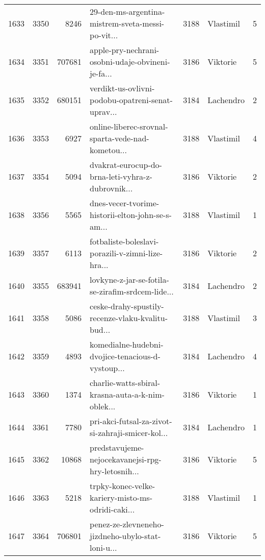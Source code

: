 \begin{tabular}{lrrlrlr}
1633 &       3350 &     8246 &  29-den-ms-argentina-mistrem-sveta-messi-po-vit... &     3188 &                    Vlastimil &               5 \\
1634 &       3351 &   707681 &  apple-pry-nechrani-osobni-udaje-obvineni-je-fa... &     3186 &                     Viktorie &               5 \\
1635 &       3352 &   680151 &  verdikt-us-ovlivni-podobu-opatreni-senat-uprav... &     3184 &                    Lachendro &               2 \\
1636 &       3353 &     6927 &  online-liberec-srovnal-sparta-vede-nad-kometou... &     3188 &                    Vlastimil &               4 \\
1637 &       3354 &     5094 &  dvakrat-eurocup-do-brna-leti-vyhra-z-dubrovnik... &     3186 &                     Viktorie &               2 \\
1638 &       3356 &     5565 &  dnes-vecer-tvorime-historii-elton-john-se-s-am... &     3188 &                    Vlastimil &               1 \\
1639 &       3357 &     6113 &  fotbaliste-boleslavi-porazili-v-zimni-lize-hra... &     3186 &                     Viktorie &               2 \\
1640 &       3355 &   683941 &  lovkyne-z-jar-se-fotila-se-zirafim-srdcem-lide... &     3184 &                    Lachendro &               2 \\
1641 &       3358 &     5086 &  ceske-drahy-spustily-recenze-vlaku-kvalitu-bud... &     3188 &                    Vlastimil &               3 \\
1642 &       3359 &     4893 &  komedialne-hudebni-dvojice-tenacious-d-vystoup... &     3184 &                    Lachendro &               4 \\
1643 &       3360 &     1374 &  charlie-watts-sbiral-krasna-auta-a-k-nim-oblek... &     3186 &                     Viktorie &               1 \\
1644 &       3361 &     7780 &  pri-akci-futsal-za-zivot-si-zahraji-smicer-kol... &     3184 &                    Lachendro &               1 \\
1645 &       3362 &    10868 &  predstavujeme-nejocekavanejsi-rpg-hry-letosnih... &     3186 &                     Viktorie &               5 \\
1646 &       3363 &     5218 &  trpky-konec-velke-kariery-misto-ms-odridi-caki... &     3188 &                    Vlastimil &               1 \\
1647 &       3364 &   706801 &  penez-ze-zlevneneho-jizdneho-ubylo-stat-loni-u... &     3186 &                     Viktorie &               5 \\

\end{tabular}
